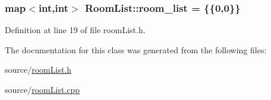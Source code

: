\subsubsection[{\texorpdfstring{room\+\_\+list}{room_list}}]{\setlength{\rightskip}{0pt plus 5cm}map$<$int,int$>$ Room\+List\+::room\+\_\+list = \{\{0,0\}\}}\hypertarget{class_room_list_abb18b2d9cafdb49884dea04a2999752e}{}\label{class_room_list_abb18b2d9cafdb49884dea04a2999752e}


Definition at line 19 of file room\+List.\+h.



The documentation for this class was generated from the following files\+:\begin{DoxyCompactItemize}
\item 
source/\hyperlink{room_list_8h}{room\+List.\+h}\item 
source/\hyperlink{room_list_8cpp}{room\+List.\+cpp}\end{DoxyCompactItemize}
